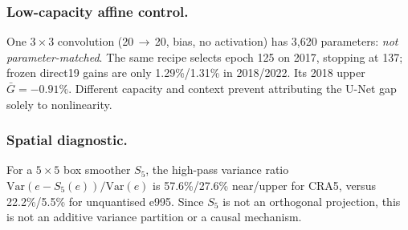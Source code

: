 \subsubsection{Low-capacity affine control.}
One $3\times3$ convolution (20\,$\to$\,20, bias, no activation) has 3{,}620
parameters: \emph{not parameter-matched}. The same recipe selects epoch 125 on
2017, stopping at 137; frozen direct19 gains are only 1.29\%/1.31\% in
2018/2022. Its 2018 upper $\bar G=-0.91\%$. Different capacity and context
prevent attributing the U-Net gap solely to nonlinearity.

\subsubsection{Spatial diagnostic.}
For a $5\times5$ box smoother $S_5$, the high-pass variance ratio
$\mathrm{Var}(e-S_5(e))/\mathrm{Var}(e)$ is 57.6\%/27.6\% near/upper for CRA5,
versus 22.2\%/5.5\% for unquantised e995. Since $S_5$ is not an orthogonal
projection, this is not an additive variance partition or a causal mechanism.
